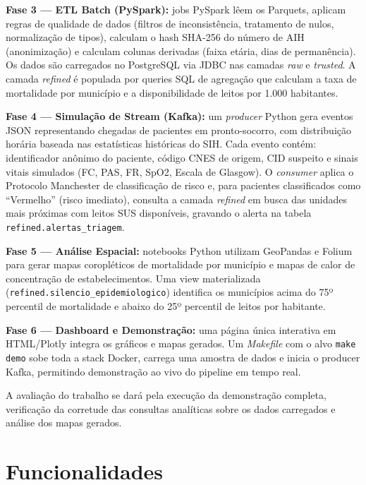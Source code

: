 \documentclass[12pt]{article}
\begin{document}
\textbf{Fase 3 — ETL Batch (PySpark):} jobs PySpark lêem os Parquets,
aplicam regras de qualidade de dados (filtros de inconsistência, tratamento
de nulos, normalização de tipos), calculam o hash SHA-256 do número de AIH
(anonimização) e calculam colunas derivadas (faixa etária, dias de permanência).
Os dados são carregados no PostgreSQL via JDBC nas camadas \textit{raw} e
\textit{trusted}. A camada \textit{refined} é populada por queries SQL de
agregação que calculam a taxa de mortalidade por município e a disponibilidade
de leitos por 1.000 habitantes.

\textbf{Fase 4 — Simulação de Stream (Kafka):} um \textit{producer} Python
gera eventos JSON representando chegadas de pacientes em pronto-socorro, com
distribuição horária baseada nas estatísticas históricas do SIH. Cada evento
contém: identificador anônimo do paciente, código CNES de origem, CID suspeito
e sinais vitais simulados (FC, PAS, FR, SpO2, Escala de Glasgow). O
\textit{consumer} aplica o Protocolo Manchester de classificação de risco e,
para pacientes classificados como ``Vermelho'' (risco imediato), consulta a
camada \textit{refined} em busca das unidades mais próximas com leitos SUS
disponíveis, gravando o alerta na tabela \texttt{refined.alertas\_triagem}.

\textbf{Fase 5 — Análise Espacial:} notebooks Python utilizam GeoPandas e
Folium para gerar mapas coropléticos de mortalidade por município e mapas de
calor de concentração de estabelecimentos. Uma view materializada
(\texttt{refined.silencio\_epidemiologico}) identifica os municípios acima do
75º percentil de mortalidade e abaixo do 25º percentil de leitos por habitante.

\textbf{Fase 6 — Dashboard e Demonstração:} uma página única interativa em
HTML/Plotly integra os gráficos e mapas gerados. Um \textit{Makefile} com o
alvo \texttt{make demo} sobe toda a stack Docker, carrega uma amostra de dados
e inicia o producer Kafka, permitindo demonstração ao vivo do pipeline em tempo real.

A avaliação do trabalho se dará pela execução da demonstração completa,
verificação da corretude das consultas analíticas sobre os dados carregados e
análise dos mapas gerados.


\section{Funcionalidades}
\end{document}
